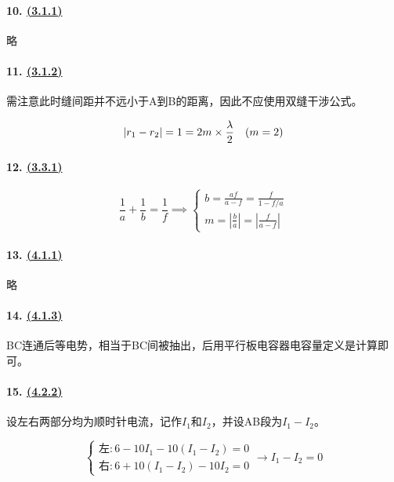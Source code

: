 \paragraph{10. \hyperref[subsec:3.1.1]{(3.1.1)}} 略
\paragraph{11. \hyperref[subsec:3.1.2]{(3.1.2)}} 需注意此时缝间距并不远小于A到B的距离，因此不应使用双缝干涉公式。

\begin{equation*}
    |r_1-r_2|=1=2m\times\frac\lambda2\quad(m=2)\\
\end{equation*}

\paragraph{12. \hyperref[subsec:3.3.1]{(3.3.1)}}

\begin{equation*}
    \frac1a+\frac1b=\frac1f\implies
    \begin{cases}
        b=\frac{af}{a-f}=\frac{f}{1-f/a}\\
        m=\left|\frac{b}{a}\right|=\left|\frac{f}{a-f}\right|
    \end{cases}
\end{equation*}

\paragraph{13. \hyperref[subsec:4.1.1]{(4.1.1)}} 略
\paragraph{14. \hyperref[subsec:4.1.3]{(4.1.3)}} BC连通后等电势，相当于BC间被抽出，后用平行板电容器电容量定义是计算即可。

\paragraph{15. \hyperref[subsec:4.2.2]{(4.2.2)}} 设左右两部分均为顺时针电流，记作$I_1$和$I_2$，并设AB段为$I_1-I_2$。

\begin{equation*}
    \begin{cases}
        \textrm{左}: 6-10I_1-10(I_1-I_2)=0\\
        \textrm{右}: 6+10(I_1-I_2)-10I_2=0
    \end{cases}\to
    I_1-I_2=0
\end{equation*}

